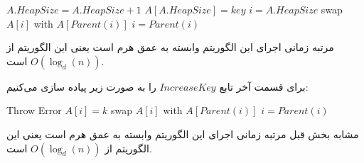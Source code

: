 {\begin{latin}
\begin{algorithm}[H]
\begin{algorithmic}
			\State $A.HeapSize = A.HeapSize + 1$
			\State $A[A.HeapSize] = key$
			\State $i = A.HeapSize$
			\State swap $A[i]$ with $A[Parent(i)]$
			\State $i = Parent(i)$
			\EndWhile
			\EndProcedure
			
			
		\end{algorithmic}
	\end{algorithm}	
\end{latin} 

مرتبه زمانی اجرای این الگوریتم وابسته به عمق هرم است یعنی این الگوریتم از
$O(\log_{d}(n))$
است.

برای قسمت آخر تابع $IncreaseKey$ را به صورت زیر پیاده سازی می‌کنیم:

\begin{latin}
	\begin{algorithm}[H]
		\begin{algorithmic}
			
			\State Throw Error
			\EndIf
			\State $A[i] = k$
			\State swap $A[i]$ with $A[Parent(i)]$
			\State $i = Parent(i)$
			\EndWhile
			\EndProcedure
			
			
		\end{algorithmic}
	\end{algorithm}	
\end{latin} 

مشابه بخش قبل مرتبه زمانی اجرای این الگوریتم وابسته به عمق هرم است یعنی این الگوریتم از
$O(\log_{d}(n))$
است.

}








